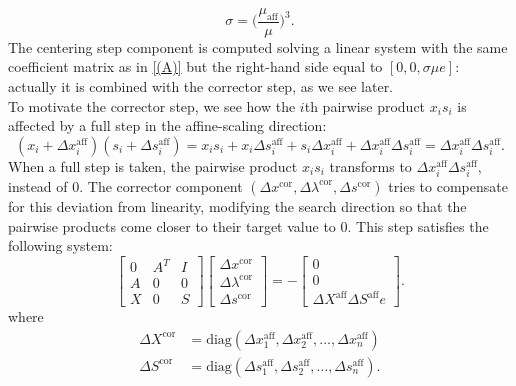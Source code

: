 \documentclass[a4paper,10 pt,titlepage,twoside]{book}
\theoremstyle{plain}
\theoremstyle{definition}
\theoremstyle{remark}
\begin{document}
\begin{equation}\label{CP}
\sigma = \bigg(\frac{\mu_{\text{aff}}}{\mu}\bigg)^{3}.
\end{equation}
The centering step component is computed solving a linear system with the same coefficient matrix as in \ref{(A)} but the right-hand side equal to $[0, 0,\sigma\mu e]$: actually it is combined with the corrector step, as we see later.\\
To motivate the corrector step, we see how the $i$th pairwise product $x_{i}s_{i}$ is affected by a full step in the affine-scaling direction:
\begin{equation*}
(x_{i}+\Delta x_{i}^{\text{aff}})(s_{i}+\Delta s_{i}^{\text{aff}})= x_{i}s_{i}+ x_{i}\Delta s_{i}^{\text{aff}}+s_{i}\Delta x_{i}^{\text{aff}}+\Delta x_{i}^{\text{aff}}\Delta s_{i}^{\text{aff}} =\Delta x_{i}^{\text{aff}}\Delta s_{i}^{\text{aff}}.
\end{equation*}
When a full step is taken, the pairwise product $x_{i}s_{i}$ transforms to $\Delta x_{i}^{\text{aff}}\Delta s_{i}^{\text{aff}}$, instead of 0. The corrector component $(\Delta x^{\text{cor}}, \Delta \lambda^{\text{cor}}, \Delta s^{\text{cor}})$ tries to compensate for this deviation from linearity, modifying the search direction so that the pairwise products come closer to their target value to 0. This step satisfies the following system:
\begin{equation}\label{(B)}
\begin{bmatrix}
0&A^{T}&I \\A&0&0\\X&0&S
\end{bmatrix}\begin{bmatrix}
\Delta x^{\text{cor}}\\\Delta\lambda^{\text{cor}} \\\Delta s^{\text{cor}}
\end{bmatrix}=-\begin{bmatrix}
0\\0\\\Delta X^{\text{aff}}\Delta S^{\text{aff}}e
\end{bmatrix}.
\end{equation}
where
\begin{align*}
\Delta X^{\text{cor}}& = \text{diag}(\Delta x_{1}^{\text{aff}}, \Delta x_{2}^{\text{aff}},\dots,\Delta x_{n}^{\text{aff}})\\
\Delta S^{\text{cor}}& = \text{diag}(\Delta s_{1}^{\text{aff}}, \Delta s_{2}^{\text{aff}},\dots,\Delta s_{n}^{\text{aff}}).
\end{align*}
\end{document}
